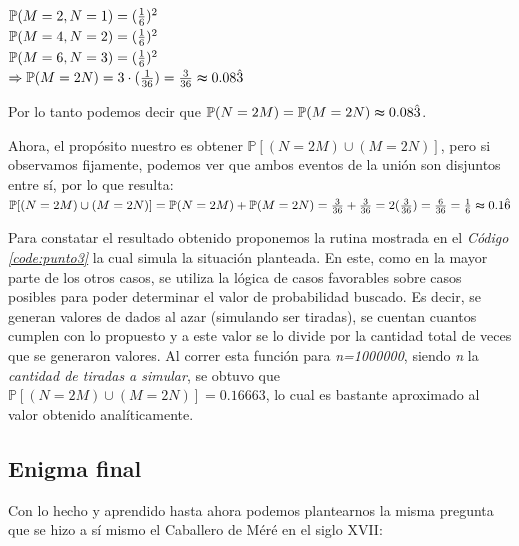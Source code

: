 \documentclass{article}
\newcommand{\refcode}[1]{\textit{Código \ref{#1}}}
\begin{document}
\indent $\mathbb{P}(M=2, N=1) = ({1 \over 6})^2$ \medskip\\
\indent $\mathbb{P}(M=4, N=2) = ({1 \over 6})^2$ \medskip\\
\indent $\mathbb{P}(M=6, N=3) = ({1 \over 6})^2$ \medskip\\

\indent $\Rightarrow \mathbb{P}(M=2N) = 3\cdot({1 \over 36}) = {3 \over 36} \thickapprox 0.08\hat{3}\\$

\medskip
\noindent Por lo tanto podemos decir que $\mathbb{P}(N=2M) = \mathbb{P}(M=2N) \thickapprox 0.08\hat{3}$.
	\par
	Ahora, el propósito nuestro es obtener $\mathbb{P}[(N=2M) \cup (M=2N)]$, pero si observamos fijamente, podemos ver que ambos eventos de la unión son disjuntos entre sí, por lo que resulta:\\

\indent $\mathbb{P}[(N=2M) \cup (M=2N)] = \mathbb{P}(N=2M) + \mathbb{P}(M=2N) = {3 \over 36} + {3 \over 36} = 2({3 \over 36}) = {6 \over 36} = {1 \over 6} \thickapprox 0.1\hat{6}  $ \medskip\\

	\par
	Para constatar el resultado obtenido proponemos la rutina mostrada en el \refcode{code:punto3} la cual simula la situación planteada. En este, como en la mayor parte de los otros casos, se utiliza la lógica de casos favorables sobre casos posibles para poder determinar el valor de probabilidad buscado. Es decir, se generan valores de dados al azar (simulando ser tiradas), se cuentan cuantos cumplen con lo propuesto y a este valor se lo divide por la cantidad total de veces que se generaron valores. Al correr esta función para \textit{n=1000000}, siendo \textit{n} la \textit{cantidad de tiradas a simular}, se obtuvo que $\mathbb{P}[(N=2M) \cup (M=2N)] = 0.16663$, lo cual es bastante aproximado al valor obtenido analíticamente.


\bigskip


\subsection{Enigma final}

Con lo hecho y aprendido hasta ahora podemos plantearnos la misma pregunta que se hizo a sí mismo el Caballero de Méré en el siglo XVII: 
\end{document}
